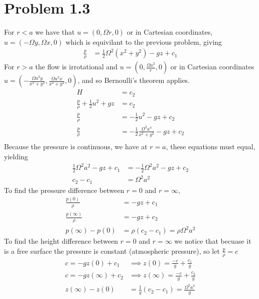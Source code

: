\documentclass[12pt]{article}
\newcommand{\eq}[1]{\begin{align*}#1\end{align*}}
\begin{document}
\section*{Problem 1.3}
For $r < a$ we have that $u = (0, \Omega r, 0)$ or in Cartesian coordinates, $u = (-\Omega y, \Omega x, 0)$ which is equivilant to the previous problem, giving
\eq{
	\frac{p}{\rho} &= \frac{1}{2}\Omega^2(x^2 + y^2) - gz + c_1
}
For $r > a$ the flow is irrotational and $u = (0, \frac{\Omega a^2}{r}, 0)$ or in Cartesian coordinates $u = (-\frac{\Omega a^2 y}{x^2 + y^2}, \frac{\Omega a^2 x}{x^2 + y^2}, 0)$, and so Bernoulli's theorem applies.
\eq{
	H &= c_2\\
	\frac{p}{\rho} + \frac{1}{2}u^2 + gz &= c_2\\
	\frac{p}{\rho} &= -\frac{1}{2}u^2 - gz + c_2\\
	\frac{p}{\rho} &= -\frac{1}{2}\frac{\Omega^2 a^4}{x^2 + y^2} - gz + c_2\\
}
Because the pressure is continuous, we have at $r = a$, these equations must equal, yielding
\eq{
	\frac{1}{2}\Omega^2a^2 - gz + c_1 &= -\frac{1}{2}\Omega^2 a^2 - gz + c_2\\
	c_2 - c_1 &= \Omega^2 a^2
}
To find the pressure difference between $r=0$ and $r=\infty$, 
\eq{
	\frac{p(0)}{\rho} &= -gz + c_1\\
	\frac{p(\infty)}{\rho} &= -gz + c_2\\
	p(\infty) - p(0) &= \rho(c_2 - c_1) = \rho\Omega^2 a^2
}
To find the height difference between $r=0$ and $r=\infty$ we notice that becuase it is a free surface the pressure is constant (atmospheric pressure), so let $\frac{p}{\rho} = c$
\eq{
	c = -gz(0) + c_1 &\implies z(0) = \frac{-c}{g} + \frac{c_1}{g}\\
	c = -gz(\infty) + c_2 &\implies z(\infty) = \frac{-c}{g} + \frac{c_2}{g}\\
	z(\infty) - z(0) &= \frac{1}{g}(c_2 - c_1) = \frac{\Omega^2 a^2}{g}
}
\end{document}
